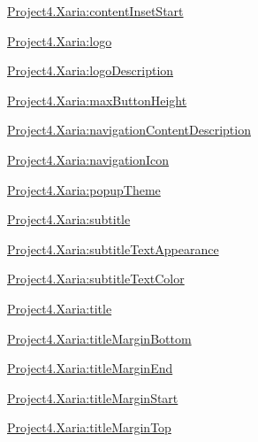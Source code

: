 {\ttfamily \hyperlink{classproject4_1_1xaria_1_1R_1_1styleable_a9834196c2626e358f21cf55efd25f27c}{Project4.\+Xaria\+:content\+Inset\+Start}}

{\ttfamily \hyperlink{classproject4_1_1xaria_1_1R_1_1styleable_a56c0b377a7daf8828ad9a239006baaaf}{Project4.\+Xaria\+:logo}}

{\ttfamily \hyperlink{classproject4_1_1xaria_1_1R_1_1styleable_ac4c21d9b696d419fa766694469674d1f}{Project4.\+Xaria\+:logo\+Description}}

{\ttfamily \hyperlink{classproject4_1_1xaria_1_1R_1_1styleable_a737f7e13fbcddd0d8f2c90ce3066e375}{Project4.\+Xaria\+:max\+Button\+Height}}

{\ttfamily \hyperlink{classproject4_1_1xaria_1_1R_1_1styleable_a7ce219ac5cd9c8b9b55a133796302f54}{Project4.\+Xaria\+:navigation\+Content\+Description}}

{\ttfamily \hyperlink{classproject4_1_1xaria_1_1R_1_1styleable_a857db4b68c78808f5d7aff17e497b305}{Project4.\+Xaria\+:navigation\+Icon}}

{\ttfamily \hyperlink{classproject4_1_1xaria_1_1R_1_1styleable_ad04ed82b66818e311f872c158b0d6df5}{Project4.\+Xaria\+:popup\+Theme}}

{\ttfamily \hyperlink{classproject4_1_1xaria_1_1R_1_1styleable_ab72a989ed660ee062ccf0405ae356a90}{Project4.\+Xaria\+:subtitle}}

{\ttfamily \hyperlink{classproject4_1_1xaria_1_1R_1_1styleable_a4b938685d0218d8e307f8df758e2ca89}{Project4.\+Xaria\+:subtitle\+Text\+Appearance}}

{\ttfamily \hyperlink{classproject4_1_1xaria_1_1R_1_1styleable_af2caead52c870ae8c1443c261585491e}{Project4.\+Xaria\+:subtitle\+Text\+Color}}

{\ttfamily \hyperlink{classproject4_1_1xaria_1_1R_1_1styleable_abef8adccf5d6ad9f215787dab4631fcd}{Project4.\+Xaria\+:title}}

{\ttfamily \hyperlink{classproject4_1_1xaria_1_1R_1_1styleable_a246fa138dbd3b691aa3595a8fb636a01}{Project4.\+Xaria\+:title\+Margin\+Bottom}}

{\ttfamily \hyperlink{classproject4_1_1xaria_1_1R_1_1styleable_a5d2d546ae88e0aa378d02d8602e73b8a}{Project4.\+Xaria\+:title\+Margin\+End}}

{\ttfamily \hyperlink{classproject4_1_1xaria_1_1R_1_1styleable_a96bcd70f7086d38b52652bee6e3f119a}{Project4.\+Xaria\+:title\+Margin\+Start}}

{\ttfamily \hyperlink{classproject4_1_1xaria_1_1R_1_1styleable_aae9e96acb00fe36e1bac77812532a605}{Project4.\+Xaria\+:title\+Margin\+Top}}

